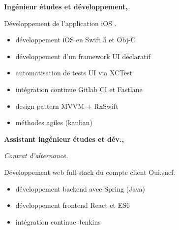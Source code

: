 \documentclass{cv}
\begin{document}
\noindent\begin{minipage}[t]{.65\textwidth}


\newlength{\logoboxwidth}
\setlength{\logoboxwidth}{20mm}

\begin{mainexpbox}[title=nov. 2019 -- aujourd'hui]

	\begin{minipage}[t]{\logoboxwidth}%
	\centering
	\end{minipage}
	\begin{minipage}[t]{0.8\textwidth}
	\textbf{Ingénieur études et développement, \evtech{}}\smallskip

	Développement de l'application iOS \href{https://apps.apple.com/fr/app/oui-sncf-train-et-bus/id343889987}{}.

	\begin{itemize}
	\item développement iOS en Swift 5 et Obj-C
	\item développement d'un framework UI déclaratif
	\item automatisation de tests UI via XCTest
	\item intégration continue Gitlab CI et Fastlane
	\item design pattern MVVM + RxSwift
	\item méthodes agiles (kanban)
	\end{itemize}
	\end{minipage}

\end{mainexpbox}

\begin{expbox}[title={déc. 2016, \faicon{clock-o} 3 ans}]

	\begin{minipage}[t]{\logoboxwidth}
	\centering
	\end{minipage}
	\begin{minipage}[t]{0.8\textwidth}
	\textbf{Assistant ingénieur études et dév., \evtech{}}\smallskip

	\textit{Contrat d'alternance.} 
	
	Développement web full-stack du compte client Oui.sncf.

	\begin{itemize}
	\item développement backend avec Spring (Java)
	\item développement frontend React et ES6
	\item intégration continue Jenkins
	\end{itemize}
	\end{minipage}


\end{expbox}
\end{minipage}
\end{document}
